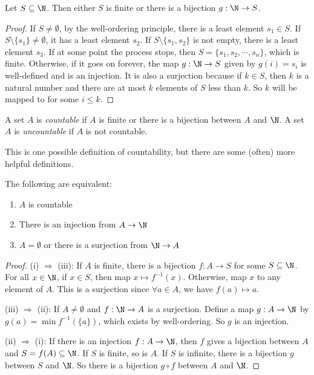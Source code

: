 \documentclass[a4paper]{article}
\begin{document}
\begin{lemma}
  Let $S\subseteq \N$. Then either $S$ is finite or there is a bijection $g:\N \to S$.
\end{lemma}

\begin{proof}
  If $S\not= \emptyset$, by the well-ordering principle, there is a least element $s_1\in S$. If $S\setminus \{s_1\} \not= \emptyset$, it has a least element $s_2$. If $S\setminus \{s_1, s_2\}$ is not empty, there is a least element $s_3$. If at some point the process stops, then $S = \{s_1, s_2,\cdots, s_n\}$, which is finite. Otherwise, if it goes on forever, the map $g: \N \to S$ given by $g(i) = s_i$ is well-defined and is an injection. It is also a surjection because if $k\in S$, then $k$ is a natural number and there are at most $k$ elements of $S$ less than $k$.  So $k$ will be mapped to for some $i\leq k$.
\end{proof}

\begin{defi}
  A set $A$ is \emph{countable} if $A$ is finite or there is a bijection between $A$ and $\N$. A set $A$ is \emph{uncountable} if $A$ is not countable.
\end{defi}

This is one possible definition of countability, but there are some (often) more helpful definitions.
\begin{thm}
  The following are equivalent:
  \begin{enumerate}
    \item $A$ is countable
    \item There is an injection from $A\to \N$
    \item $A = \emptyset$ or there is a surjection from $\N \to A$
  \end{enumerate}
\end{thm}

\begin{proof}
  (i) $\Rightarrow$ (iii): If $A$ is finite, there is a bijection $f: A \to S$ for some $S\subseteq \N$. For all $x\in \N$, if $x\in S$, then map $x\mapsto f^{-1}(x)$. Otherwise, map $x$ to any element of $A$. This is a surjection since $\forall a\in A$, we have $f(a)\mapsto a$.

  (iii) $\Rightarrow$ (ii): If $A\not= \emptyset$ and $f: \N\to A$ is a surjection. Define a map $g: A\to \N$ by $g(a) = \min f^{-1}(\{a\})$, which exists by well-ordering. So $g$ is an injection.

  (ii) $\Rightarrow$ (i): If there is an injection $f: A\to \N$, then $f$ gives a bijection between $A$ and $S = f(A)\subseteq \N$. If $S$ is finite, so is $A$. If $S$ is infinite, there is a bijection $g$ between $S$ and $\N$. So there is a bijection $g\circ f$ between $A$ and $\N$.
\end{proof}
\end{document}
